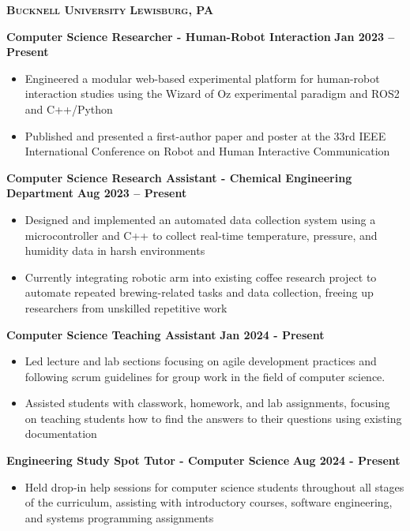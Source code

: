 \documentclass{article}
\newcommand{\textscbf}[1]{\textbf{\textsc{#1}}}
\begin{document}
\textscbf{Bucknell University} \hfill \textscbf{Lewisburg, PA}

\textbf{Computer Science Researcher - Human-Robot Interaction} \hfill \textbf{Jan 2023 – Present}
\begin{itemize}[noitemsep,topsep=2pt]
    \item Engineered a modular web-based experimental platform for human-robot interaction studies using the Wizard of Oz experimental paradigm and ROS2 and C++/Python
    \item Published and presented a first-author paper and poster at the 33rd IEEE International Conference on Robot and Human Interactive Communication
\end{itemize}

\textbf{Computer Science Research Assistant - Chemical Engineering Department} \hfill \textbf{Aug 2023 – Present}
\begin{itemize}[noitemsep,topsep=2pt]
    \item Designed and implemented an automated data collection system using a microcontroller and C++ to collect real-time temperature, pressure, and humidity data in harsh environments
    \item Currently integrating robotic arm into existing coffee research project to automate repeated brewing-related tasks and data collection, freeing up researchers from unskilled repetitive work
\end{itemize}

\textbf{Computer Science Teaching Assistant} \hfill \textbf{Jan 2024 - Present}
\begin{itemize}[noitemsep,topsep=2pt]
	\item Led lecture and lab sections focusing on agile development practices and following scrum guidelines for group work in the field of computer science.
	\item Assisted students with classwork, homework, and lab assignments, focusing on teaching students how to find the answers to their questions using existing documentation
\end{itemize}

\textbf{Engineering Study Spot Tutor - Computer Science} \hfill \textbf{Aug 2024 - Present}
\begin{itemize}[noitemsep,topsep=2pt]
	\item Held drop-in help sessions for computer science students throughout all stages of the curriculum, assisting with introductory courses, software engineering, and systems programming assignments
\end{itemize}
\end{document}
